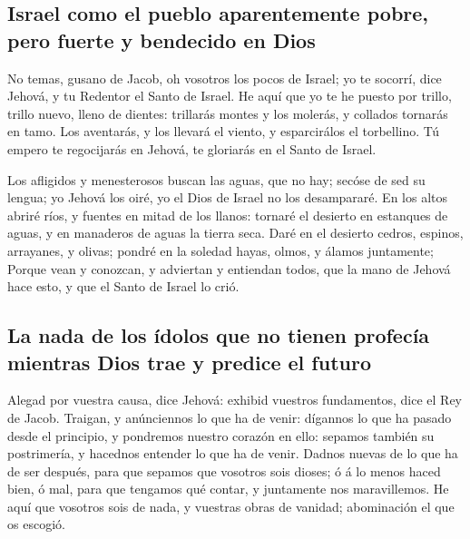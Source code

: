 \hypertarget{israel-como-el-pueblo-aparentemente-pobre-pero-fuerte-y-bendecido-en-dios}{%
\subsection{Israel como el pueblo aparentemente pobre, pero fuerte y
bendecido en
Dios}\label{israel-como-el-pueblo-aparentemente-pobre-pero-fuerte-y-bendecido-en-dios}}

 No temas, gusano de Jacob, oh vosotros los pocos de
Israel; yo te socorrí, dice Jehová, y tu Redentor el Santo de Israel.
 He aquí que yo te he puesto por trillo, trillo nuevo,
lleno de dientes: trillarás montes y los molerás, y collados tornarás en
tamo.  Los aventarás, y los llevará el viento, y
esparcirálos el torbellino. Tú empero te regocijarás en Jehová, te
gloriarás en el Santo de Israel.

 Los afligidos y menesterosos buscan las aguas, que no
hay; secóse de sed su lengua; yo Jehová los oiré, yo el Dios de Israel
no los desampararé.  En los altos abriré ríos, y fuentes
en mitad de los llanos: tornaré el desierto en estanques de aguas, y en
manaderos de aguas la tierra seca.  Daré en el desierto
cedros, espinos, arrayanes, y olivas; pondré en la soledad hayas, olmos,
y álamos juntamente;  Porque vean y conozcan, y adviertan
y entiendan todos, que la mano de Jehová hace esto, y que el Santo de
Israel lo crió.

\hypertarget{la-nada-de-los-uxeddolos-que-no-tienen-profecuxeda-mientras-dios-trae-y-predice-el-futuro}{%
\subsection{La nada de los ídolos que no tienen profecía mientras Dios
trae y predice el
futuro}\label{la-nada-de-los-uxeddolos-que-no-tienen-profecuxeda-mientras-dios-trae-y-predice-el-futuro}}

 Alegad por vuestra causa, dice Jehová: exhibid vuestros
fundamentos, dice el Rey de Jacob.  Traigan, y
anúnciennos lo que ha de venir: dígannos lo que ha pasado desde el
principio, y pondremos nuestro corazón en ello: sepamos también su
postrimería, y hacednos entender lo que ha de venir. 
Dadnos nuevas de lo que ha de ser después, para que sepamos que vosotros
sois dioses; ó á lo menos haced bien, ó mal, para que tengamos qué
contar, y juntamente nos maravillemos.  He aquí que
vosotros sois de nada, y vuestras obras de vanidad; abominación el que
os escogió.

